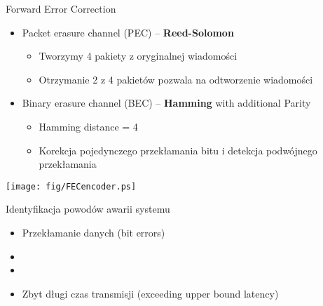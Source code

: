 \documentclass[compress,red]{beamer}
\begin{document}
\begin{frame}{Forward Error Correction}

      \begin{itemize}
	\item Packet erasure channel (PEC) -- {\bf Reed-Solomon}
	\begin{itemize}
	  \item Tworzymy 4 pakiety z oryginalnej wiadomości
	  \item Otrzymanie 2 z 4 pakietów pozwala na odtworzenie wiadomości
	\end{itemize}
	\item Binary erasure channel (BEC) -- {\bf Hamming} with additional Parity
	\begin{itemize}
	  \item Hamming distance = 4
	  \item Korekcja pojedynczego przekłamania bitu i detekcja podwójnego przekłamania
	\end{itemize}    
      \end{itemize}


      \begin{center}
      \texttt{[image: fig/FECencoder.ps]}
      \end{center}

\end{frame}
\begin{frame}{Identyfikacja powodów awarii systemu}


  \begin{itemize}
    \item Przekłamanie danych (bit errors)
    \item  {}
    \item \color{black}{Awaria elementów sieci (element failure)}
    \item Zbyt długi czas transmisji (exceeding upper bound latency)
  \end{itemize}

\end{frame}
\end{document}
